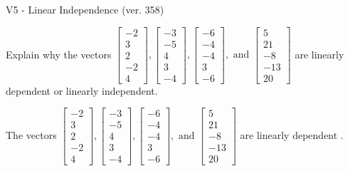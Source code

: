 \begin{exercise}
  \begin{exerciseTitle}V5 - Linear Independence (ver. 358)\end{exerciseTitle}
  \begin{exerciseStatement}
    Explain why the vectors \(\left[\begin{array}{r}
-2 \\
3 \\
2 \\
-2 \\
4
\end{array}\right] , \left[\begin{array}{r}
-3 \\
-5 \\
4 \\
3 \\
-4
\end{array}\right] , \left[\begin{array}{r}
-6 \\
-4 \\
-4 \\
3 \\
-6
\end{array}\right] , \text{ and } \left[\begin{array}{r}
5 \\
21 \\
-8 \\
-13 \\
20
\end{array}\right]\) are linearly dependent or linearly independent.	


  \end{exerciseStatement}
  \begin{exerciseAnswer}
   The vectors \(\left[\begin{array}{r}
-2 \\
3 \\
2 \\
-2 \\
4
\end{array}\right] , \left[\begin{array}{r}
-3 \\
-5 \\
4 \\
3 \\
-4
\end{array}\right] , \left[\begin{array}{r}
-6 \\
-4 \\
-4 \\
3 \\
-6
\end{array}\right] , \text{ and } \left[\begin{array}{r}
5 \\
21 \\
-8 \\
-13 \\
20
\end{array}\right]\) are 
  	 linearly dependent  .
  


  \end{exerciseAnswer}
\end{exercise}